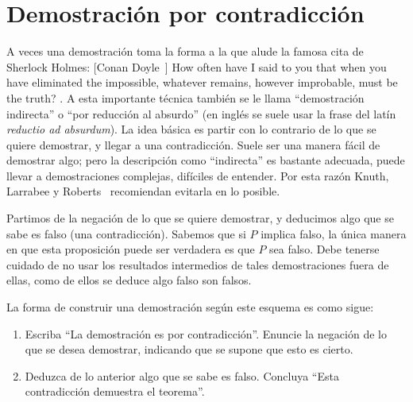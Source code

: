 \section{Demostración por contradicción}
\label{sec:contradiccion}

  A veces una demostración toma la forma
  a la que alude la famosa cita de Sherlock Holmes:%
      [Conan Doyle~\cite{conan90:_sign_four}]{%
    How often have I said to you
    that when you have eliminated the impossible,
    whatever remains,
    however improbable,
    must be the truth?%
  }.%
  A esta importante técnica
  también se le llama ``demostración indirecta''
  o ``por reducción al absurdo''
  (en inglés se suele usar
   la frase del latín
     \emph{\foreignlanguage{latin}{reductio ad absurdum}}).
  La idea básica
  es partir con lo contrario de lo que se quiere demostrar,
  y llegar a una contradicción.
  Suele ser una manera fácil de demostrar algo;
  pero la descripción como ``indirecta'' es bastante adecuada,
  puede llevar a demostraciones complejas,
  difíciles de entender.
  Por esta razón Knuth, Larrabee y Roberts~%
     \cite{knuth89:_math_writing}
  recomiendan evitarla en lo posible.

  Partimos de la negación de lo que se quiere demostrar,
  y deducimos algo que se sabe es falso
  (una contradicción).%
  Sabemos que si \(P\) implica falso,
  la única manera en que esta proposición puede ser verdadera
  es que \(P\) sea falso.
  Debe tenerse cuidado de no usar los resultados intermedios
  de tales demostraciones fuera de ellas,
  como de ellos se deduce algo falso son falsos.

  La forma de construir una demostración según este esquema
  es como sigue:
  \begin{enumerate}
  \item
    Escriba ``La demostración es por contradicción''.
    Enuncie la negación de lo que se desea demostrar,
    indicando que se supone que esto es cierto.
  \item
    Deduzca de lo anterior algo que se sabe es falso.
    Concluya ``Esta contradicción demuestra el teorema''.
  \end{enumerate}

